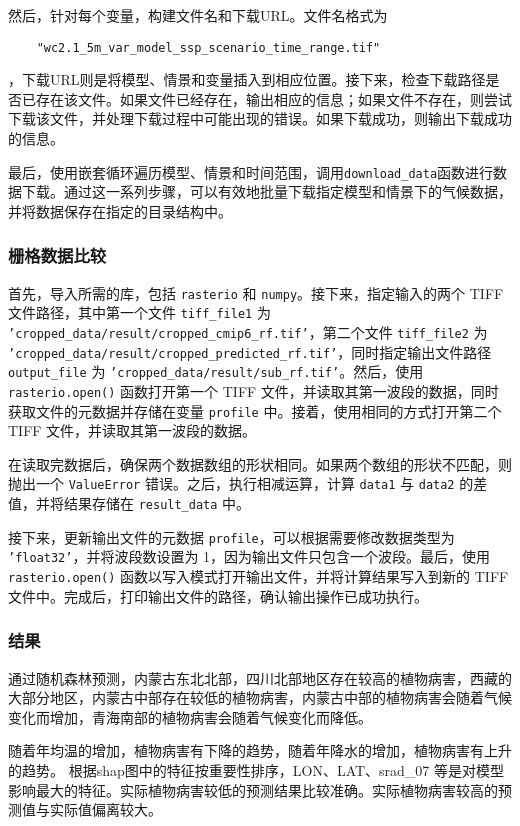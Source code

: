\documentclass{article}
\begin{document}
然后，针对每个变量，构建文件名和下载URL。文件名格式为
\begin{lstlisting}
	"wc2.1_5m_var_model_ssp_scenario_time_range.tif"
\end{lstlisting}
，下载URL则是将模型、情景和变量插入到相应位置。接下来，检查下载路径是否已存在该文件。如果文件已经存在，输出相应的信息；如果文件不存在，则尝试下载该文件，并处理下载过程中可能出现的错误。如果下载成功，则输出下载成功的信息。

最后，使用嵌套循环遍历模型、情景和时间范围，调用\texttt{download\_data}函数进行数据下载。通过这一系列步骤，可以有效地批量下载指定模型和情景下的气候数据，并将数据保存在指定的目录结构中。


\subsubsection{栅格数据比较}
首先，导入所需的库，包括 \texttt{rasterio} 和 \texttt{numpy}。接下来，指定输入的两个 TIFF 文件路径，其中第一个文件 \texttt{tiff\_file1} 为 \texttt{'cropped\_data/result/cropped\_cmip6\_rf.tif'}，第二个文件 \texttt{tiff\_file2} 为 \texttt{'cropped\_data/result/cropped\_predicted\_rf.tif'}，同时指定输出文件路径 \texttt{output\_file} 为 \texttt{'cropped\_data/result/sub\_rf.tif'}。然后，使用 \texttt{rasterio.open()} 函数打开第一个 TIFF 文件，并读取其第一波段的数据，同时获取文件的元数据并存储在变量 \texttt{profile} 中。接着，使用相同的方式打开第二个 TIFF 文件，并读取其第一波段的数据。

在读取完数据后，确保两个数据数组的形状相同。如果两个数组的形状不匹配，则抛出一个 \texttt{ValueError} 错误。之后，执行相减运算，计算 \texttt{data1} 与 \texttt{data2} 的差值，并将结果存储在 \texttt{result\_data} 中。

接下来，更新输出文件的元数据 \texttt{profile}，可以根据需要修改数据类型为 \texttt{'float32'}，并将波段数设置为 1，因为输出文件只包含一个波段。最后，使用 \texttt{rasterio.open()} 函数以写入模式打开输出文件，并将计算结果写入到新的 TIFF 文件中。完成后，打印输出文件的路径，确认输出操作已成功执行。



\subsubsection{结果}
通过随机森林预测，内蒙古东北北部，四川北部地区存在较高的植物病害，西藏的大部分地区，内蒙古中部存在较低的植物病害，内蒙古中部的植物病害会随着气候变化而增加，青海南部的植物病害会随着气候变化而降低。

随着年均温的增加，植物病害有下降的趋势，随着年降水的增加，植物病害有上升的趋势。
根据shap图中的特征按重要性排序，LON、LAT、srad\_07 等是对模型影响最大的特征。实际植物病害较低的预测结果比较准确。实际植物病害较高的预测值与实际值偏离较大。
\end{document}
